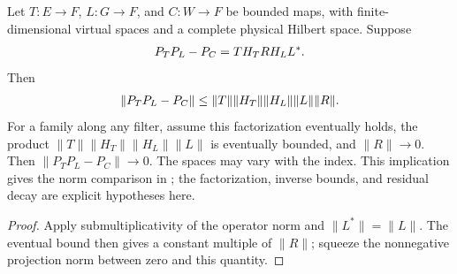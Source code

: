 \begin{lemma}
    \label{thm:supported_gram_projector_norm}
    \leanok
    Let $T:E\to F$, $L:G\to F$, and $C:W\to F$ be bounded
    maps, with finite-dimensional virtual spaces and a complete physical
    Hilbert space. Suppose
    \begin{align}
        P_TP_L-P_C=T H_T R H_L L^*.
        \notag
    \end{align}
    Then
    \begin{align}
        \|P_TP_L-P_C\|
        \le \|T\|\|H_T\|\|H_L\|\|L\|\|R\|.
        \notag
    \end{align}
    For a family along any filter, assume this factorization eventually
    holds, the product $\|T\|\|H_T\|\|H_L\|\|L\|$ is eventually
    bounded, and $\|R\|\to0$. Then $\|P_TP_L-P_C\|\to0$.
    The spaces may vary with the index. This implication gives the
    norm comparison in \cite[Lemma commutation (ii)]{Nachtergaele1996Spectral};
    the factorization, inverse bounds, and residual decay are explicit
    hypotheses here.
\end{lemma}
\begin{proof}\leanok
    Apply submultiplicativity of the operator norm and $\|L^*\|=\|L\|$.
    The eventual bound then gives a constant multiple of $\|R\|$;
    squeeze the nonnegative projection norm between zero and this quantity.
\end{proof}

